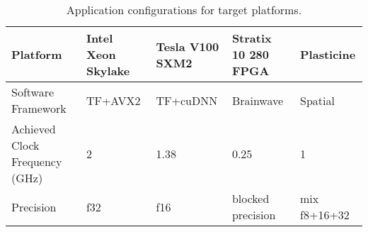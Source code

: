 \begin{table}
\caption{Application configurations for target platforms.}
\label{tab:appconf}
\centering
\scriptsize
\begin{tabular}{L{1.8cm}M{1cm}M{1cm}M{1cm}M{1.5cm}}
\toprule
Platform                       & Intel Xeon Skylake & Tesla V100 SXM2 & Stratix 10 280 FPGA & Plasticine\\
\midrule
Software Framework             & TF+AVX2                   & TF+cuDNN        & Brainwave           & Spatial \\
Achieved Clock Frequency (GHz) & 2                         & 1.38            & 0.25                & 1 \\
Precision                      & f32                       & f16             & blocked precision   & mix f8+16+32\\
\bottomrule
\end{tabular}
\end{table}

